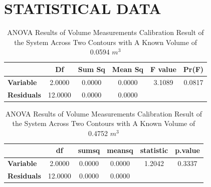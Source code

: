 \chapter{STATISTICAL DATA}
\label{appen:c}




\begin{table}[H]
	\centering
	\caption{ANOVA Results of Volume Measurements Calibration Result of the System Across Two Contours with A Known Volume of 0.0594 $m^3$}
	\label{table-anova-1}
	\begin{tabular}{@{}lccccc@{}}
		\toprule
		                   & \textbf{Df} & \textbf{Sum Sq} & \textbf{Mean Sq} & \textbf{F value} & \textbf{Pr(\>F)} \\ \midrule
		\textbf{Variable}  & 2.0000      & 0.0000          & 0.0000           & 3.1089           & 0.0817           \\
		\textbf{Residuals} & 12.0000     & 0.0000          & 0.0000           &                  &                  \\ \bottomrule
	\end{tabular}%
\end{table}

\begin{table}[H]
	\centering
	\caption{ANOVA Results of Volume Measurements Calibration Result of the System Across Two Contours with A Known Volume of 0.4752 $m^3$}
	\label{table-anova-2}
	\begin{tabular}{@{}lccccc@{}}
		\toprule
		                   & \textbf{df} & \textbf{sumsq} & \textbf{meansq} & \textbf{statistic} & \textbf{p.value} \\ \midrule
		\textbf{Variable}  & 2.0000      & 0.0000         & 0.0000          & 1.2042             & 0.3337           \\
		\textbf{Residuals} & 12.0000     & 0.0000         & 0.0000          &                    &                  \\ \bottomrule
	\end{tabular}%
\end{table}

